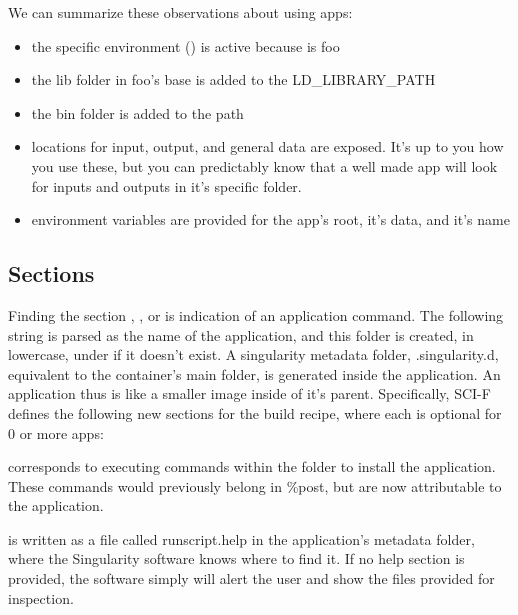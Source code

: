 \documentclass[letterpaper,10pt,english]{sphinxmanual}
\begin{document}
We can summarize these observations about using apps:
\begin{itemize}
\item {} 
the specific environment () is active because  is foo

\item {} 
the lib folder in foo’s base is added to the LD\_LIBRARY\_PATH

\item {} 
the bin folder is added to the path

\item {} 
locations for input, output, and general data are exposed. It’s up to
you how you use these, but you can predictably know that a well made
app will look for inputs and outputs in it’s specific folder.

\item {} 
environment variables are provided for the app’s root, it’s data, and
it’s name

\end{itemize}


\subsection{Sections}
\label{\detokenize{reproducible_scif_apps:sections}}
Finding the section  ,  , or  is indication of an application command.
The following string is parsed as the name of the application, and
this folder is created, in lowercase, under  if it doesn’t exist. A
singularity metadata folder, .singularity.d, equivalent to the
container’s main folder, is generated inside the application. An
application thus is like a smaller image inside of it’s parent.
Specifically, SCI-F defines the following new sections for the build
recipe, where each is optional for 0 or more apps:

 corresponds to executing commands within the folder to
install the application. These commands would previously belong in
\%post, but are now attributable to the application.

 is written as a file called runscript.help in the
application’s metadata folder, where the Singularity software knows
where to find it. If no help section is provided, the software simply
will alert the user and show the files provided for inspection.
\end{document}
